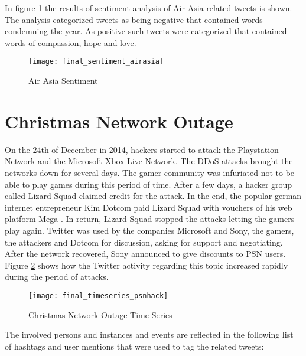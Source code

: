 In figure \ref{fig:air-asia-sentiment} the results of sentiment analysis of Air Asia related tweets is shown. The analysis categorized tweets as being negative that contained words condemning the year. As positive such tweets were categorized that contained words of compassion, hope and love. 

\begin{figure}[H]
  \centering
        \texttt{[image: final\_sentiment\_airasia]}
  \caption[Air Asia Sentiment]{Air Asia Sentiment}
  \label{fig:air-asia-sentiment}
  \vspace{-1.3em}
\end{figure}

\section{Christmas Network Outage}
\label{sec:christmas-network-outage}
On the 24th of December in 2014, hackers started to attack the Playstation Network and the Microsoft Xbox Live Network. The DDoS attacks brought the networks down for several days. The gamer community was infuriated not to be able to play games during this period of time.\cite{wool2014sony}
After a few days, a hacker group called Lizard Squad claimed credit for the attack.
In the end, the popular german internet entrepreneur Kim Dotcom paid Lizard Squad with vouchers of his web platform Mega \cite{Dotcom2014}. In return, Lizard Squad stopped the attacks letting the gamers play again. Twitter was used by the companies Microsoft and Sony, the gamers, the attackers and Dotcom for discussion, asking for support and negotiating. After the network recovered, Sony announced to give discounts to PSN users. Figure \ref{fig:christmas-network-outage-time-series} shows how the Twitter activity regarding this topic increased rapidly during the period of attacks. 

\begin{figure}[H]
  \centering
        \texttt{[image: final\_timeseries\_psnhack]}
  \caption[Christmas Network Outage Time Series]{Christmas Network Outage Time Series}
  \label{fig:christmas-network-outage-time-series}
  \vspace{-1.3em}
\end{figure}

The involved persons and instances and events are reflected in the following list of hashtags and user mentions that were used to tag the related tweets:


